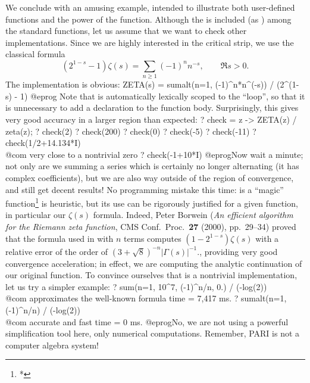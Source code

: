  We conclude with an amusing example, intended to
illustrate both user-defined functions and the power of the 
function. Although the  is included (as
) among the standard functions, let us assume that we want to check
other implementations. Since we are highly interested in the critical strip,
we use the classical formula
$$ (2^{1-s} - 1)\zeta(s) = \sum_{n\geq 1} (-1)^n n^{-s},
  \qquad\Re s > 0.$$
The implementation is obvious:
\bprog
ZETA(s) = sumalt(n=1, (-1)^n*n^(-s)) / (2^(1-s) - 1)
@eprog
\noindent
Note that  is automatically lexically scoped to the 
``loop'', so that it is unnecessary to add a  declaration to the
function body. Surprisingly, this gives very good accuracy in a larger region
than expected:
\bprog
? check = z -> ZETA(z) / zeta(z);
? check(2)
? check(200)
? check(0)
? check(-5)
? check(-11)
? check(1/2+14.134*I)  \\@com very close to a nontrivial zero
? check(-1+10*I)
@eprog\noindent Now wait a minute; not only are we summing a series which is
certainly no longer alternating (it has complex coefficients), but we are
also way outside of the region of convergence, and still get decent results! No
programming mistake this time:  is a
``magic'' function\footnote{*}{ is heuristic, but its use can be
rigorously justified for a given function, in particular our $\zeta(s)$
formula. Indeed, Peter Borwein (\emph{An efficient algorithm for the Riemann
zeta function}, CMS Conf.~Proc.~{\bf 27} (2000), pp.~29--34) proved that the
formula used in  with $n$ terms computes $(1-2^{1-s})\zeta(s)$
with a relative error of the order of $(3+\sqrt{8})^{-n}|\Gamma(s)|^{-1}$.},
providing very good convergence acceleration; in effect, we are computing
the analytic continuation of our original function. To convince ourselves
that  is a nontrivial implementation, let us try a simpler
example:
\bprog
? sum(n=1, 10^7, (-1)^n/n, 0.) / (-log(2)) \\@com approximates the well-known formula
time = 7,417 ms.
? sumalt(n=1, (-1)^n/n) / (-log(2))        \\@com accurate and fast
time = 0 ms.
@eprog\noindent No, we are not using a powerful simplification tool here,
only numerical computations. Remember, PARI is not a computer algebra system!


